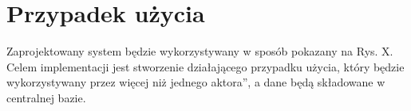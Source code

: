 \section{Przypadek użycia}
\label{cha:przyp}

Zaprojektowany system będzie wykorzystywany w sposób pokazany na Rys. X. Celem implementacji jest stworzenie działającego przypadku użycia, który będzie wykorzystywany przez więcej niż jednego  \quotedblbase aktora\textquotedblright, a dane będą składowane w centralnej bazie.


